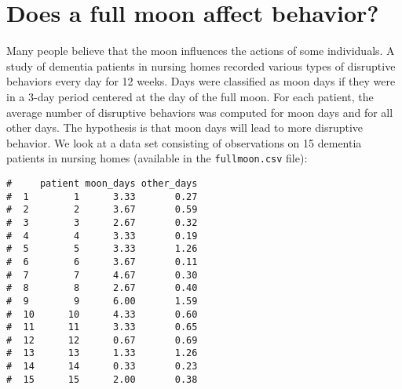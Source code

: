 \documentclass[letterpaper,9pt,twoside,printwatermark=false]{pinp}
\begin{document}
\section{Does a full moon affect
behavior?}\label{does-a-full-moon-affect-behavior}

Many people believe that the moon influences the actions of some
individuals. A study of dementia patients in nursing homes recorded
various types of disruptive behaviors every day for 12 weeks. Days were
classified as moon days if they were in a 3-day period centered at the
day of the full moon. For each patient, the average number of disruptive
behaviors was computed for moon days and for all other days. The
hypothesis is that moon days will lead to more disruptive behavior. We
look at a data set consisting of observations on 15 dementia patients in
nursing homes (available in the \texttt{fullmoon.csv} file):

\begin{Shaded}
\begin{Highlighting}[]
\StringTok{ }\NormalTok{(}\NormalTok{)}
\end{Highlighting}
\end{Shaded}

\begin{ShadedResult}
\begin{verbatim}
#     patient moon_days other_days
#  1        1      3.33       0.27
#  2        2      3.67       0.59
#  3        3      2.67       0.32
#  4        4      3.33       0.19
#  5        5      3.33       1.26
#  6        6      3.67       0.11
#  7        7      4.67       0.30
#  8        8      2.67       0.40
#  9        9      6.00       1.59
#  10      10      4.33       0.60
#  11      11      3.33       0.65
#  12      12      0.67       0.69
#  13      13      1.33       1.26
#  14      14      0.33       0.23
#  15      15      2.00       0.38
\end{verbatim}
\end{ShadedResult}
\end{document}
